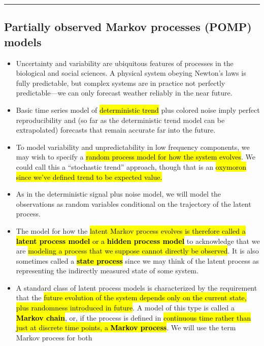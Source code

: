 \documentclass[]{article}
\begin{document}
\begin{center}\rule{0.5\linewidth}{\linethickness}\end{center}

\subsection{Partially observed Markov processes (POMP)
models}\label{partially-observed-markov-processes-pomp-models}

\begin{itemize}
\item
  Uncertainty and variability are ubiquitous features of processes in
  the biological and social sciences. A physical system obeying Newton's
  laws is fully predictable, but complex systems are in practice not
  perfectly predictable---we can only forecast weather reliably in the
  near future.
\item
  Basic time series model of \hl{deterministic trend} plus colored noise
  imply perfect reproducibility and (so far as the deterministic trend
  model can be extrapolated) forecasts that remain accurate far into the
  future.
\item
  To model variability and unpredictability in low frequency components,
  we may wish to specify a \hl{random process model for how the system
  evolves}. We could call this a ``stochastic trend'' approach, though
  that is an \hl{oxymoron since we've defined trend to be expected value.}
\item
  As in the deterministic signal plus noise model, we will model the
  observations as random variables conditional on the trajectory of the
  latent process.
\item
  The model for how the \hl{latent Markov process evolves is therefore
  called a \textbf{latent process model} or a \textbf{hidden process
  model}} to acknowledge that we are \hl{modeling a process that we suppose
  cannot directly be observed}. It is also sometimes called a
  \hl{\textbf{state process}} since we may think of the latent process as
  representing the indirectly measured state of some system.
\item
  A standard class of latent process models is characterized by the
  requirement that the \hl{future evolution of the system depends only on
  the current state, plus randomness introduced in future}. A model of
  this type is called a \hl{\textbf{Markov chain}}, or, if the process is
  defined in \hl{continuous time rather than just at discrete time points, a
  \textbf{Markov process}}. We will use the term Markov process for both

\end{itemize}
\end{document}
